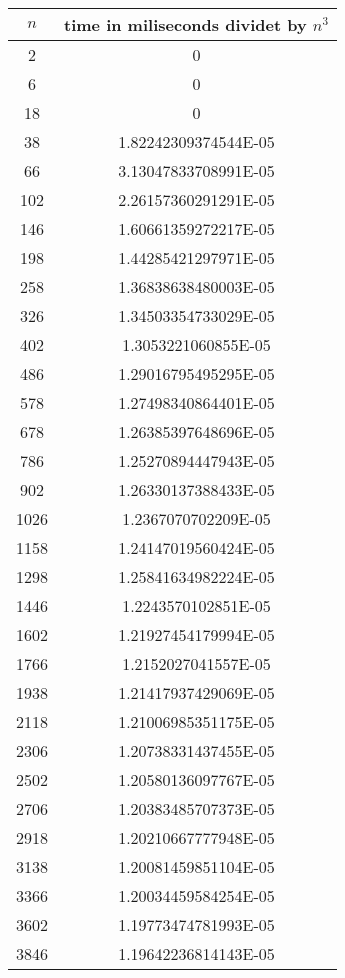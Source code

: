 \begin{table}[H]
\centering
\begin{tabular}{ |c|c| } 
 \hline
$n$ & time in miliseconds dividet by $n^3$ \\
\hline
2 & 0 \\
\hline
6 & 0 \\
\hline
18 & 0 \\
\hline
38 & 1.82242309374544E-05 \\
\hline
66 & 3.13047833708991E-05 \\
\hline
102 & 2.26157360291291E-05 \\
\hline
146 & 1.60661359272217E-05 \\
\hline
198 & 1.44285421297971E-05 \\
\hline
258 & 1.36838638480003E-05 \\
\hline
326 & 1.34503354733029E-05 \\
\hline
402 & 1.3053221060855E-05 \\
\hline
486 & 1.29016795495295E-05 \\
\hline
578 & 1.27498340864401E-05 \\
\hline
678 & 1.26385397648696E-05 \\
\hline
786 & 1.25270894447943E-05 \\
\hline
902 & 1.26330137388433E-05 \\
\hline
1026 & 1.2367070702209E-05 \\
\hline
1158 & 1.24147019560424E-05 \\
\hline
1298 & 1.25841634982224E-05 \\
\hline
1446 & 1.2243570102851E-05 \\
\hline
1602 & 1.21927454179994E-05 \\
\hline
1766 & 1.2152027041557E-05 \\
\hline
1938 & 1.21417937429069E-05 \\
\hline
2118 & 1.21006985351175E-05 \\
\hline
2306 & 1.20738331437455E-05 \\
\hline
2502 & 1.20580136097767E-05 \\
\hline
2706 & 1.20383485707373E-05 \\
\hline
2918 & 1.20210667777948E-05 \\
\hline
3138 & 1.20081459851104E-05 \\
\hline
3366 & 1.20034459584254E-05 \\
\hline
3602 & 1.19773474781993E-05 \\
\hline
3846 & 1.19642236814143E-05 \\

\end{tabular}
\end{table}
